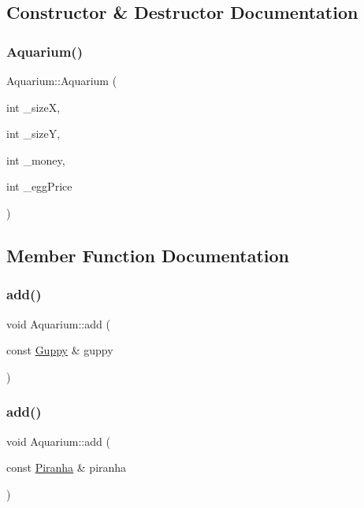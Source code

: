 \subsection{Constructor \& Destructor Documentation}
\mbox{\label{class_aquarium_a62a4dae7e6f07cb1b753ac87c0dd90e0}} 
\subsubsection{\texorpdfstring{Aquarium()}{Aquarium()}}
{\footnotesize\ttfamily Aquarium\+::\+Aquarium (\begin{DoxyParamCaption}\item[{int}]{\+\_\+sizeX,  }\item[{int}]{\+\_\+sizeY,  }\item[{int}]{\+\_\+money,  }\item[{int}]{\+\_\+egg\+Price }\end{DoxyParamCaption})}



\subsection{Member Function Documentation}
\mbox{\label{class_aquarium_a320872320862a83e64bc85b895efc21f}} 
\subsubsection{\texorpdfstring{add()}{add()}\hspace{0.1cm}{\footnotesize\ttfamily [1/5]}}
{\footnotesize\ttfamily void Aquarium\+::add (\begin{DoxyParamCaption}\item[{const \mbox{\hyperlink{class_guppy}{Guppy}} \&}]{guppy }\end{DoxyParamCaption})}

\mbox{\label{class_aquarium_ad9d2de6ec229fdcdec009bc9a641fe98}} 
\subsubsection{\texorpdfstring{add()}{add()}\hspace{0.1cm}{\footnotesize\ttfamily [2/5]}}
{\footnotesize\ttfamily void Aquarium\+::add (\begin{DoxyParamCaption}\item[{const \mbox{\hyperlink{class_piranha}{Piranha}} \&}]{piranha }\end{DoxyParamCaption})}

